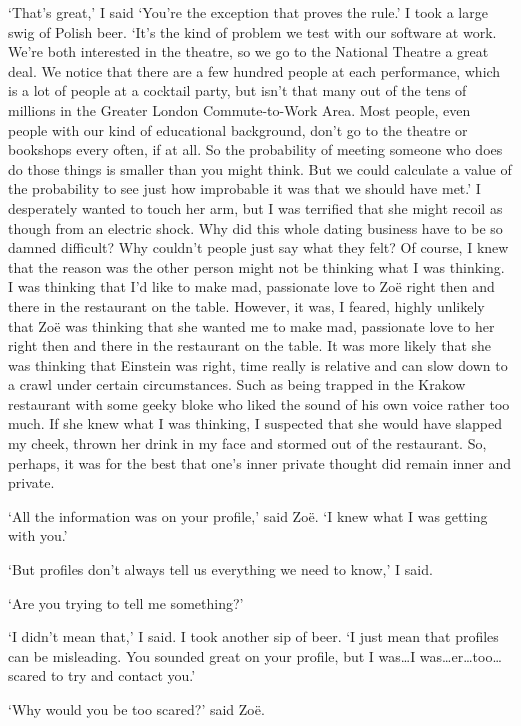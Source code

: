 `That's great,' I said `You're the exception that proves the rule.'
I took a large swig of Polish beer. `It's the kind of problem we
test with our software at work. We're both interested in the
theatre, so we go to the National Theatre a great deal. We notice
that there are a few hundred people at each performance, which is a
lot of people at a cocktail party, but isn't that many out of the
tens of millions in the Greater London Commute-to-Work Area. Most
people, even people with our kind of educational background, don't
go to the theatre or bookshops every often, if at all. So the
probability of meeting someone who does do those things is smaller
than you might think. But we could calculate a value of the
probability to see just how improbable it was that we should have
met.' I desperately wanted to touch her arm, but I was terrified
that she might recoil as though from an electric shock. Why did this
whole dating business have to be so damned difficult? Why couldn't
people just say what they felt? Of course, I knew that the reason
was the other person might not be thinking what I was thinking. I
was thinking that I'd like to make mad, passionate love to Zoë
right then and there in the restaurant on the table. However, it
was, I feared, highly unlikely that Zoë was thinking that she
wanted me to make mad, passionate love to her right then and there
in the restaurant on the table. It was more likely that she was
thinking that Einstein was right, time really is relative and can
slow down to a crawl under certain circumstances. Such as being
trapped in the Krakow restaurant with some geeky bloke who liked the
sound of his own voice rather too much. If she knew what I was
thinking, I suspected that she would have slapped my cheek, thrown
her drink in my face and stormed out of the restaurant. So, perhaps,
it was for the best that one's inner private thought did remain
inner and private.

`All the information was on your profile,' said Zoë. `I knew
what I was getting with you.'

`But profiles don't always tell us everything we need to know,' I
said.

`Are you trying to tell me something?'

`I didn't mean that,' I said. I took another sip of beer. `I just
mean that profiles can be misleading. You sounded great on your
profile, but I was\dots I was\dots er\dots too\dots scared to try
and contact you.'

`Why would you be too scared?' said Zoë.

